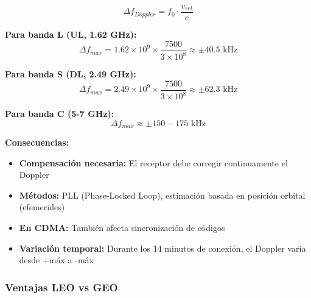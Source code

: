 \documentclass[a4paper,11pt]{article}
\begin{document}
$$\Delta f_{Doppler} = f_0 \cdot \frac{v_{rel}}{c}$$

\textbf{Para banda L (UL, 1.62 GHz):}
$$\Delta f_{max} = 1.62 \times 10^9 \times \frac{7500}{3 \times 10^8} \approx \pm 40.5 \text{ kHz}$$

\textbf{Para banda S (DL, 2.49 GHz):}
$$\Delta f_{max} = 2.49 \times 10^9 \times \frac{7500}{3 \times 10^8} \approx \pm 62.3 \text{ kHz}$$

\textbf{Para banda C (5-7 GHz):}
$$\Delta f_{max} \approx \pm 150-175 \text{ kHz}$$

\textbf{Consecuencias:}
\begin{itemize}
    \item \textbf{Compensación necesaria:} El receptor debe corregir continuamente el Doppler
    \item \textbf{Métodos:} PLL (Phase-Locked Loop), estimación basada en posición orbital (efemerides)
    \item \textbf{En CDMA:} También afecta sincronización de códigos
    \item \textbf{Variación temporal:} Durante los 14 minutos de conexión, el Doppler varía desde +máx a -máx
\end{itemize}

\subsubsection*{Ventajas LEO vs GEO}
\end{document}
